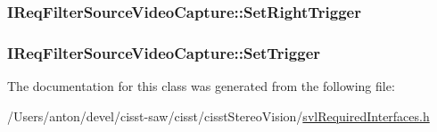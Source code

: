 \subsubsection[{Set\+Right\+Trigger}]{ I\+Req\+Filter\+Source\+Video\+Capture\+::\+Set\+Right\+Trigger}\label{class_i_req_filter_source_video_capture_a2e4c7dd3ff46016da70c23ffe9730552}
\hypertarget{class_i_req_filter_source_video_capture_a98af73f8fa32e3104594021816f91175}{}
\subsubsection[{Set\+Trigger}]{ I\+Req\+Filter\+Source\+Video\+Capture\+::\+Set\+Trigger}\label{class_i_req_filter_source_video_capture_a98af73f8fa32e3104594021816f91175}


The documentation for this class was generated from the following file\+:\begin{DoxyCompactItemize}
\item 
/\+Users/anton/devel/cisst-\/saw/cisst/cisst\+Stereo\+Vision/\hyperlink{svl_required_interfaces_8h}{svl\+Required\+Interfaces.\+h}\end{DoxyCompactItemize}
